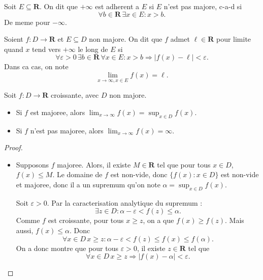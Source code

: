 \begin{definition}
Soit $E\subseteq \mathbf{R}$. On dit que $+\infty$ est adherent a $E$ si $E$ n'est pas majore, c-a-d si 
$$
\forall b\in \mathbf{R}\,\exists x \in E: x>b.
$$
De meme pour $-\infty$.
\end{definition}
\begin{definition}
Soient $f:D\to \mathbf{R}$ et $E\subseteq D$ non majore. On dit que $f$ admet $\ell \in \mathbf{R}$ pour limite quand $x$ tend vers $+\infty$ le long de $E$ si
$$
\forall\varepsilon>0\,\exists b\in \mathbf{R}\,\forall x \in E:x>b \Rightarrow |f(x)-\ell|<\varepsilon.
$$
Dans ca cas, on note
$$
\lim_{ x \to \infty,x \in E }f(x)=\ell.
$$
\end{definition}
\begin{theorem}
Soit $f:D\to \mathbf{R}$ croissante, avec $D$ non majore. 
\begin{itemize}
\item Si $f$ est majoree, alors $\lim_{ x \to \infty }f(x)=\sup_{x \in D}f(x)$.
\item Si $f$ n'est pas majoree, alors $\lim_{ x \to \infty }f(x)=\infty$.
\end{itemize}
\end{theorem}
\begin{proof}
\begin{itemize}
\item Supposons $f$ majoree. Alors, il existe $M\in \mathbf{R}$ tel que pour tous $x \in D$, $f(x)\le M$. Le domaine de $f$ est non-vide, donc $\{ f(x):x \in D \}$ est non-vide et majoree, donc il a un supremum qu'on note $\alpha=\sup_{x \in D}f(x)$.

Soit $\varepsilon>0$. Par la caracterisation analytique du supremum :
$$
\exists z\in D:\alpha -\varepsilon<f(z)\le \alpha.
$$
Comme  $f$ est croissante, pour tous $x\ge z$, on a que $f(x)\ge f(z)$. Mais aussi, $f(x)\le \alpha$. Donc 
$$
\forall x \in D\,x\ge z:\alpha -\varepsilon<f(z)\le f(x)\le f(\alpha).
$$
On a donc montre que pour tous $\varepsilon>0$, il existe $z\in \mathbf{R}$ tel que 
$$
\forall x \in D\, x\ge z \Rightarrow |f(x)-\alpha|<\varepsilon.
$$
\end{itemize}
\end{proof}
